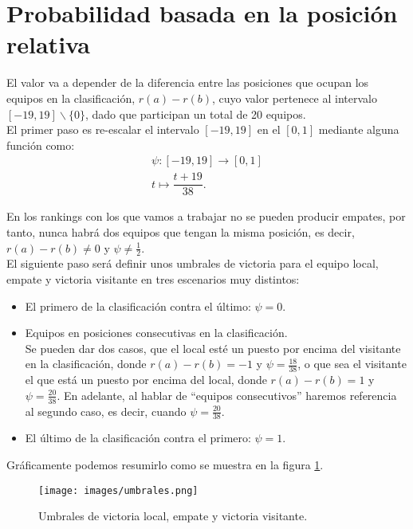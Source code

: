 \section{Probabilidad basada en la posición relativa}
El valor va a depender de la diferencia entre las posiciones que ocupan los equipos en la clasificación, $r(a)-r(b)$, cuyo valor pertenece al intervalo $[-19,19] \backslash \{0\}$, dado que participan un total de 20 equipos.\\

El primer paso es re-escalar el intervalo $[-19,19]$ en el $[0,1]$ mediante alguna función como:
\begin{eqnarray*}
	\psi: [-19,19] \longrightarrow [0,1] \\
	t \longmapsto \dfrac{t+19}{38}.
\end{eqnarray*}

En los rankings con los que vamos a trabajar no se pueden producir empates, por tanto, nunca habrá dos equipos que tengan la misma posición, es decir, $r(a)-r(b)\neq 0$ y $\psi \neq \frac{1}{2}$.\\

El siguiente paso será definir unos umbrales de victoria para el equipo local, empate y victoria visitante en tres escenarios muy distintos:
\begin{itemize}
	\item El primero de la clasificación contra el último: $\psi = 0$.
	\item Equipos en posiciones consecutivas en la clasificación. \\
	Se pueden dar dos casos, que el local esté un puesto por encima del visitante en la clasificación, donde $r(a)-r(b) = -1$ y $\psi = \frac{18}{38}$, o que sea el visitante el que está un puesto por encima del local, donde $r(a)-r(b)=1$ y $\psi = \frac{20}{38}$. En adelante, al hablar de ``equipos consecutivos'' haremos referencia al segundo caso, es decir, cuando $\psi=\frac{20}{38}$.
	\item El último de la clasificación contra el primero: $\psi = 1$.
\end{itemize}

Gráficamente podemos resumirlo como se muestra en la figura \ref{fig:umbrales}.

\begin{figure}[H]
		\centering
		\texttt{[image: images/umbrales.png]}
		\caption{Umbrales de victoria local, empate y victoria visitante.} \label{fig:umbrales}
\end{figure}

